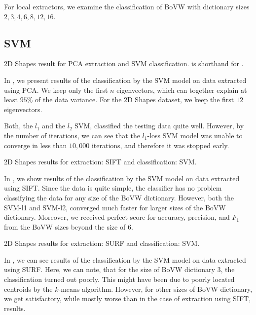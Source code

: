 For local extractors, we examine the classification of BoVW with dictionary sizes $2, 3, 4, 6, 8, 12, 16$.

\subsection{SVM}

\begin{table}[ht!]
    \centering
    
    \caption[2D Shapes result for PCA extraction and SVM classification]{2D Shapes result for PCA extraction and SVM classification.  is shorthand for .}
    \label{tab:2d_PCA_SVM}
\end{table}
In , we present results of the classification by the SVM model on data extracted using PCA. We keep only the first $n$ eigenvectors, which can together explain at least $95\%$ of the data variance. For the 2D Shapes dataset, we keep the first $12$ eigenvectors.

Both, the $l_1$ and the $l_2$ SVM, classified the testing data quite well. However, by the number of iterations, we can see that the $l_1$-loss SVM model was unable to converge in less than $10,000$ iterations, and therefore it was stopped early.

\begin{table}[ht!]
    \centering
    
    \caption[2D Shapes results for extraction: SIFT and classification: SVM]{2D Shapes results for extraction: SIFT and classification: SVM.}
    \label{tab:2d_SIFT_SVM}
\end{table}
In , we show results of the classification by the SVM model on data extracted using SIFT. Since the data is quite simple, the classifier has no problem classifying the data for any size of the BoVW dictionary. However, both the SVM-l1 and SVM-l2, converged much faster for larger sizes of the BoVW dictionary. Moreover, we received perfect score for accuracy, precision, and $F_1$ from the BoVW sizes beyond the size of $6$.

\begin{table}[ht!]
    \centering
    
    \caption[2D Shapes results for extraction: SURF and classification: SVM]{2D Shapes results for extraction: SURF and classification: SVM.}
    \label{tab:2d_SURF_SVM}
\end{table}
In , we can see results of the classification by the SVM model on data extracted using SURF. Here, we can note, that for the size of BoVW dictionary $3$, the classification turned out poorly. This might have been due to poorly located centroids by the $k$-means algorithm. However, for other sizes of BoVW dictionary, we get satisfactory, while mostly worse than in the case of extraction using SIFT, results.

